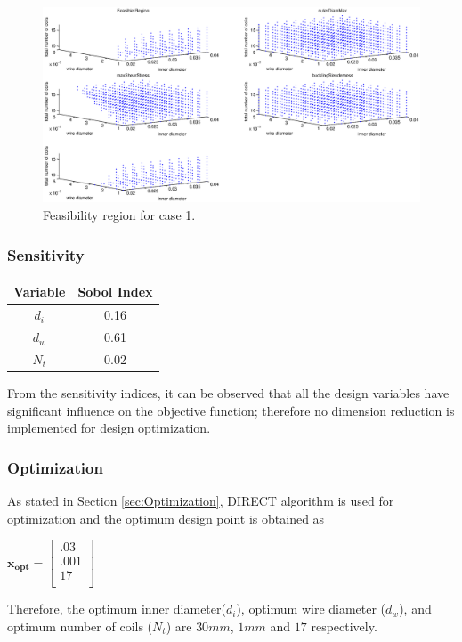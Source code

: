 \documentclass[10pt]{article}
\begin{document}
			\begin{figure}[h!]
		 \begin{center}\includegraphics[scale=.25]{Case_56_38910_Feasibility.eps}\end{center}
		 \caption{Feasibility region for case 1.}
		 \label{Feasibility region for case 1.}
		 \end{figure}

	
	\subsubsection{Sensitivity}
	
\begin{center}
	 \begin{tabular}{| c  | c |  }
	 	\hline Variable & Sobol Index\\
	 	\hline $d_{i}$ & 0.16 \\
		\hline $d_{w}$ & 0.61  \\
		\hline $N_{t}$ & 0.02 \\ 
		\hline
	 \end{tabular}
\end{center}

From the sensitivity indices, it can be observed that all the design variables have significant influence on the objective function; therefore no dimension reduction is implemented for design optimization. 

	\subsubsection{Optimization}
	
	As stated in Section \ref{sec:Optimization}, DIRECT algorithm is used for optimization and the optimum design point is obtained as 
	\begin{center}
	$\mathbf{x_{opt}} =
	\left[
	\begin{array}{c}
	 	 .03 \\
	 	 .001 \\
		 17    \\ 
		
	 \end{array}
	 \right]
$	
\end{center}
    Therefore, the optimum inner diameter($d_{i}$), optimum wire diameter ($d_{w}$), and optimum number of coils ($N_{t}$) are $30 mm$, $1 mm$ and $17$ respectively.
	
\end{document}
